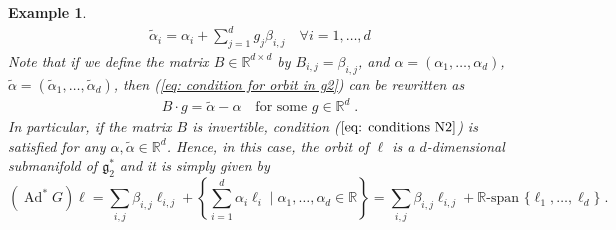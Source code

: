 \documentclass[pdflatex,sn-mathphys-num]{sn-jnl}
\theoremstyle{thmstyletwo}
\theoremstyle{thmstyleone}
\theoremstyle{thmstyletwo}
\newtheorem{example}[definition]{Example}
\newcommand{\fancyg}{\mathfrak{g}}
\newcommand{\coadjoint}{\operatorname{Ad}^*}
\newcommand{\R}{\mathbb{R}}
\begin{document}
\begin{example}
		\begin{align}\label{eq: condition for orbit in g2}
			\tilde{\alpha}_i = \alpha_i + \sum_{j = 1}^dg_j \beta_{i,j} \quad \forall i= 1, \ldots, d 
		\end{align}
		Note that if we define the matrix $B \in \mathbb{R}^{d\times d}$ by $B_{i,j} = \beta_{i,j}$, and $\alpha = (\alpha_1, \ldots, \alpha_d)$, $\tilde{\alpha} = (\tilde{\alpha}_1, \ldots, \tilde{\alpha}_d)$, then (\ref{eq: condition for orbit in g2}) can be rewritten as
		\begin{align}
			B\cdot g = \tilde{\alpha}-\alpha \quad \text{for some } g\in \mathbb{R}^d \;. \label{eq: conditions N2}
		\end{align}
		In particular, if the matrix $B$ is invertible, condition ($\ref{eq: conditions N2}$) is satisfied for any $\alpha, \tilde{\alpha} \in \mathbb{R}^d$. Hence, in this case, the orbit of $\ell$ is a $d$-dimensional submanifold of $\fancyg_2^*$ and it is simply given by 
		\begin{equation*}
			(\coadjoint G) \ell = \sum_{i,j} \beta_{i,j} \ell_{i,j} + \left\{\sum_{i=1}^d \alpha_i \ell_i \; | \; \alpha_1, \ldots, \alpha_d \in \mathbb{R}\right\} = \sum_{i,j} \beta_{i,j} \ell_{i,j} + \R\text{-span }\{\ell_1, \ldots, \ell_d\} \;.
		\end{equation*}
	\end{example}
\end{document}
